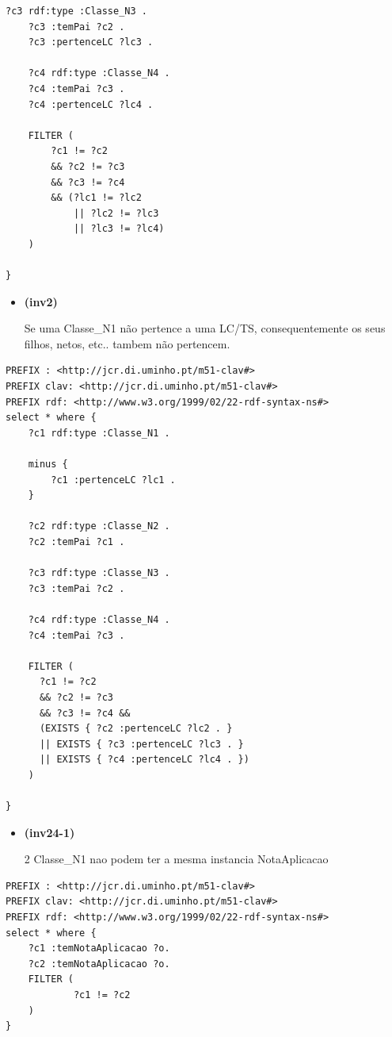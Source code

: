 \documentclass[tikz,runningheads,a4paper]{llncs}
\begin{document}
\begin{subappendices}
\begin{lstlisting}[language=sparql, frame=single, basicstyle=\scriptsize]
    ?c3 rdf:type :Classe_N3 .
    ?c3 :temPai ?c2 .
    ?c3 :pertenceLC ?lc3 .
    
    ?c4 rdf:type :Classe_N4 .
    ?c4 :temPai ?c3 .
    ?c4 :pertenceLC ?lc4 .
    
    FILTER (
        ?c1 != ?c2 
        && ?c2 != ?c3
        && ?c3 != ?c4
        && (?lc1 != ?lc2
            || ?lc2 != ?lc3
            || ?lc3 != ?lc4)
    )
    
}
\end{lstlisting}

\begin{itemize}
\tightlist
\item
  \hypertarget{inv2}{\textbf{(inv2)}} Se uma Classe\_N1 não pertence a uma LC/TS,
  consequentemente os seus filhos, netos, etc.. tambem não pertencem.
\end{itemize}

\begin{lstlisting}[language=sparql, frame=single, basicstyle=\scriptsize]
PREFIX : <http://jcr.di.uminho.pt/m51-clav#>
PREFIX clav: <http://jcr.di.uminho.pt/m51-clav#>
PREFIX rdf: <http://www.w3.org/1999/02/22-rdf-syntax-ns#>
select * where { 
    ?c1 rdf:type :Classe_N1 .
    
    minus {
        ?c1 :pertenceLC ?lc1 .
    }
    
    ?c2 rdf:type :Classe_N2 .
    ?c2 :temPai ?c1 .
    
    ?c3 rdf:type :Classe_N3 .
    ?c3 :temPai ?c2 .
    
    ?c4 rdf:type :Classe_N4 .
    ?c4 :temPai ?c3 .
    
    FILTER (
      ?c1 != ?c2 
      && ?c2 != ?c3
      && ?c3 != ?c4 &&
      (EXISTS { ?c2 :pertenceLC ?lc2 . }
      || EXISTS { ?c3 :pertenceLC ?lc3 . }
      || EXISTS { ?c4 :pertenceLC ?lc4 . })
    )
    
}
\end{lstlisting}

\begin{itemize}
\tightlist
\item
  \hypertarget{inv24-1}{\textbf{(inv24-1)}} 2 Classe\_N1 nao podem ter a mesma instancia
  NotaAplicacao
\end{itemize}

\begin{lstlisting}[language=sparql, frame=single, basicstyle=\scriptsize]
PREFIX : <http://jcr.di.uminho.pt/m51-clav#>
PREFIX clav: <http://jcr.di.uminho.pt/m51-clav#>
PREFIX rdf: <http://www.w3.org/1999/02/22-rdf-syntax-ns#>
select * where { 
    ?c1 :temNotaAplicacao ?o.
    ?c2 :temNotaAplicacao ?o.
    FILTER (
            ?c1 != ?c2
    )
}
\end{lstlisting}


\end{subappendices}
\end{document}
